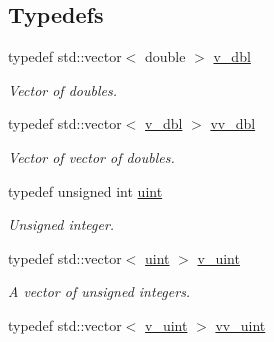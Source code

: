 \subsection*{Typedefs}
\begin{DoxyCompactItemize}
\item 
typedef std\+::vector$<$ double $>$ \hyperlink{namespacepruner_a44842dd002b20706deed84d8e317d546}{v\+\_\+dbl}\hypertarget{namespacepruner_a44842dd002b20706deed84d8e317d546}{}\label{namespacepruner_a44842dd002b20706deed84d8e317d546}

\begin{DoxyCompactList}\small\item\em Vector of doubles. \end{DoxyCompactList}\item 
typedef std\+::vector$<$ \hyperlink{namespacepruner_a44842dd002b20706deed84d8e317d546}{v\+\_\+dbl} $>$ \hyperlink{namespacepruner_a2f2b147cbaa63e2687ee9ae0cb94fea7}{vv\+\_\+dbl}\hypertarget{namespacepruner_a2f2b147cbaa63e2687ee9ae0cb94fea7}{}\label{namespacepruner_a2f2b147cbaa63e2687ee9ae0cb94fea7}

\begin{DoxyCompactList}\small\item\em Vector of vector of doubles. \end{DoxyCompactList}\item 
typedef unsigned int \hyperlink{namespacepruner_a659e6e64a9e2b8e981c3d34262a2f67e}{uint}\hypertarget{namespacepruner_a659e6e64a9e2b8e981c3d34262a2f67e}{}\label{namespacepruner_a659e6e64a9e2b8e981c3d34262a2f67e}

\begin{DoxyCompactList}\small\item\em Unsigned integer. \end{DoxyCompactList}\item 
typedef std\+::vector$<$ \hyperlink{namespacepruner_a659e6e64a9e2b8e981c3d34262a2f67e}{uint} $>$ \hyperlink{namespacepruner_af0145646bd7ede012cd336b416bc5579}{v\+\_\+uint}\hypertarget{namespacepruner_af0145646bd7ede012cd336b416bc5579}{}\label{namespacepruner_af0145646bd7ede012cd336b416bc5579}

\begin{DoxyCompactList}\small\item\em A vector of unsigned integers. \end{DoxyCompactList}\item 
typedef std\+::vector$<$ \hyperlink{namespacepruner_af0145646bd7ede012cd336b416bc5579}{v\+\_\+uint} $>$ \hyperlink{namespacepruner_acc0badaa0c5a170f5f93cfc20ec428a2}{vv\+\_\+uint}\hypertarget{namespacepruner_acc0badaa0c5a170f5f93cfc20ec428a2}{}\label{namespacepruner_acc0badaa0c5a170f5f93cfc20ec428a2}


\end{DoxyCompactItemize}
